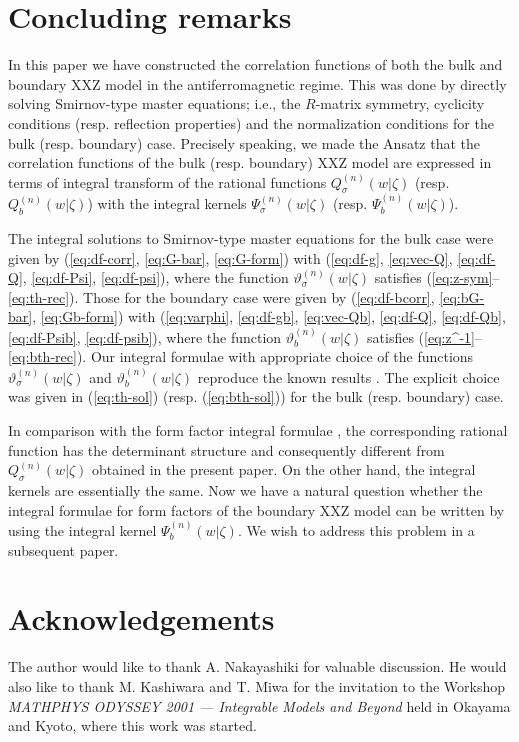 \documentclass[a4paper,10pt]{article}
\begin{document}
{\section{Concluding remarks} 

In this paper we have constructed the correlation 
functions of both the bulk and boundary XXZ model in the 
antiferromagnetic regime. This was done by directly solving 
Smirnov-type master equations; i.e., the $R$-matrix symmetry, 
cyclicity conditions (resp. reflection properties) and 
the normalization conditions for the bulk (resp. boundary) 
case. Precisely speaking, we made the Ansatz that the 
correlation functions of the bulk (resp. boundary) XXZ model 
are expressed in terms of integral transform of the rational 
functions $Q^{(n)}_\sigma(w|\zeta )$ 
(resp. $Q^{(n)}_b (w|\zeta )$) with the integral 
kernels $\Psi^{(n)}_\sigma(w|\zeta )$ (resp. 
$\Psi^{(n)}_b (w|\zeta )$). 

The integral solutions to Smirnov-type master 
equations for the bulk case were given by 
(\ref{eq:df-corr}, \ref{eq:G-bar}, \ref{eq:G-form}) 
with (\ref{eq:df-g}, \ref{eq:vec-Q}, \ref{eq:df-Q}, 
\ref{eq:df-Psi}, \ref{eq:df-psi}), where 
the function $\vartheta^{(n)}_\sigma (w|\zeta )$ 
satisfies (\ref{eq:z-sym}--\ref{eq:th-rec}). Those for 
the boundary case were given by 
(\ref{eq:df-bcorr}, \ref{eq:bG-bar}, \ref{eq:Gb-form}) 
with (\ref{eq:varphi}, \ref{eq:df-gb}, \ref{eq:vec-Qb}, 
\ref{eq:df-Q}, \ref{eq:df-Qb}, \ref{eq:df-Psib}, 
\ref{eq:df-psib}), where the function 
$\vartheta^{(n)}_b (w|\zeta )$ satisfies 
(\ref{eq:z^-1}--\ref{eq:bth-rec}). Our integral formulae 
with appropriate choice of the functions 
$\vartheta^{(n)}_\sigma(w|\zeta )$ and 
$\vartheta^{(n)}_b (w|\zeta )$ reproduce the 
known results \cite{CORR,JKKKM}. The explicit choice was 
given in (\ref{eq:th-sol}) (resp. (\ref{eq:bth-sol})) 
for the bulk (resp. boundary) case. 

In comparison with the form factor integral formulae 
\cite{JKMQ,KMQ,affine}, the corresponding rational function 
has the determinant structure and consequently different 
from $Q^{(n)}_\sigma(w|\zeta )$ obtained in the present 
paper. On the other hand, the integral kernels are essentially 
the same. Now we have a natural question whether the integral 
formulae for form factors of the boundary XXZ model can be 
written by using the integral kernel $\Psi^{(n)}_b (w|\zeta )$. 
We wish to address this problem in a subsequent paper. 

\section*{Acknowledgements}
The author would like to thank A. Nakayashiki for 
valuable discussion. He would also like to thank 
M. Kashiwara and T. Miwa for the invitation to 
the Workshop {\it MATHPHYS ODYSSEY 2001 --- 
Integrable Models and Beyond} held in 
Okayama and Kyoto, where this work was started. 

}
\end{document}
